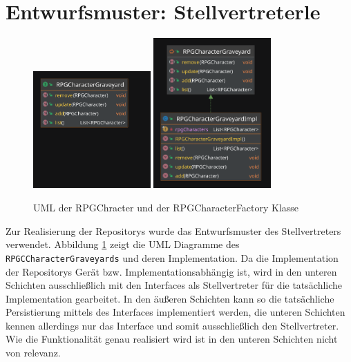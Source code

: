 \section{Entwurfsmuster:  Stellvertreterle}
\begin{figure}[H]
	\centering
	\includegraphics[width=0.4\textwidth]{Bilder/RPGCharacterGraveyard.pdf}
	\includegraphics[width=0.4\textwidth]{Bilder/RPGCharacterGraveyardImpl.pdf}
	\caption{UML der RPGChracter und der RPGCharacterFactory Klasse}
	\label{fig:Stellvertreter}
\end{figure}
Zur Realisierung der Repositorys wurde das Entwurfsmuster des Stellvertreters verwendet. Abbildung \ref{fig:Stellvertreter} zeigt die UML Diagramme des \texttt{RPGCCharacterGraveyards} und deren Implementation. Da die Implementation der Repositorys Gerät bzw. Implementationsabhängig ist, wird in den unteren Schichten ausschließlich mit den Interfaces als Stellvertreter für die tatsächliche Implementation gearbeitet. In den äußeren Schichten kann so die tatsächliche Persistierung mittels des Interfaces implementiert werden, die unteren Schichten kennen allerdings nur das Interface und somit ausschließlich den Stellvertreter. Wie die Funktionalität genau realisiert wird ist in den unteren Schichten nicht von relevanz.
